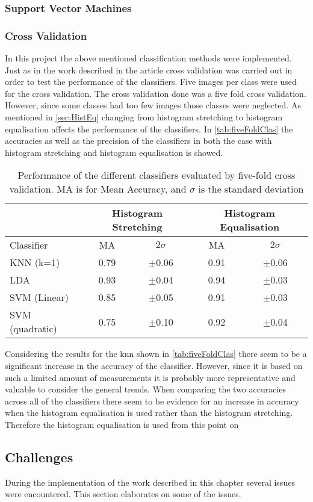 \subsubsection*{Support Vector Machines}




\subsubsection*{Cross Validation}
In this project the above mentioned classification methods were implemented. Just as in the work described in the article cross validation was carried out in order to test the performance of the classifiers. Five images per class were used for the cross validation. The cross validation done was a five fold cross validation. However, since some classes had too few images those classes were neglected. As mentioned in \autoref{sec:HistEq} changing from histogram stretching to histogram equalisation affects the performance of the classifiers. In \autoref{tab:fiveFoldClas} the accuracies as well as the precision of the classifiers in both the case with histogram stretching and histogram equalisation is showed.  

\begin{table}[h]
\centering
\begin{tabular}{|l|c|c|c|c|}
\cline{2-5}
\multicolumn{1}{c|}{}&\multicolumn{2}{c|}{Histogram Stretching}&\multicolumn{2}{c|}{Histogram Equalisation}\\
\hline
Classifier&MA&$2\sigma$&MA&$2\sigma$\\
\hline
KNN (k=1)&0.79&$\pm$0.06&0.91&$\pm$0.06\\
\hline
LDA&0.93&$\pm$0.04&0.94&$\pm$0.03\\
\hline
SVM (Linear)&0.85&$\pm$0.05&0.91&$\pm$0.03\\
\hline
SVM (quadratic)&0.75&$\pm$0.10&0.92&$\pm$0.04\\
\hline
\end{tabular}
\caption{Performance of the different classifiers evaluated by five-fold cross validation. MA is for Mean Accuracy, and $\sigma$ is the standard deviation}
\label{tab:fiveFoldClas}
\end{table} 
Considering the results for the \gls{knn} shown in \autoref{tab:fiveFoldClas} there seem to be a significant increase in the accuracy of the classifier. However, since it is based on such a limited amount of measurements it is probably more representative and valuable to consider the general trends. When comparing the two accuracies across all of the classifiers there seem to be evidence for an increase in accuracy when the histogram equalisation is used rather than the histogram stretching. Therefore the histogram equalisation is used from this point on 


\subsection{Challenges}
During the implementation of the work described in this chapter several issues were encountered. This section elaborates on some of the issues. 

\subsubsection{} 











